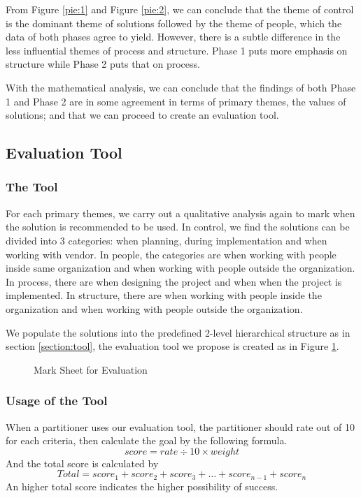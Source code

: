 From Figure \ref{pie:1} and Figure \ref{pie:2}, we can conclude that the theme of control is the dominant theme of solutions followed by the theme of people, which the data of both phases agree to yield. However, there is a subtle difference in the less influential themes of process and structure. Phase 1 puts more emphasis on structure while Phase 2 puts that on process.

With the mathematical analysis, we can conclude that the findings of both Phase 1 and Phase 2 are in some agreement in terms of primary themes, the values of solutions; and that we can proceed to create an evaluation tool.

\subsection{Evaluation Tool}

\subsubsection{The Tool}

For each primary themes, we carry out a qualitative analysis again to mark when the solution is recommended to be used. In control, we find the solutions can be divided into 3 categories: when planning, during implementation and when working with vendor. In people, the categories are when working with people inside same organization and when working with people outside the organization. In process, there are when designing the project and when when the project is implemented. In structure, there are when working with people inside the organization and when working with people outside the organization.

We populate the solutions into the predefined 2-level hierarchical structure as in section \ref{section:tool}, the evaluation tool we propose is created as in Figure \ref{table:tool}.

\begin{figure}[ht]
\centering
\caption{Mark Sheet for Evaluation}
\label{table:tool}
\end{figure}
\subsubsection{Usage of the Tool}

When a partitioner uses our evaluation tool, the partitioner should rate out of 10 for each criteria, then calculate the goal by the following formula.
$$
score = rate \div 10 \times weight
$$
And the total score is calculated by
$$
Total = score_1 + score_2 + score_3 + \ldots + score_{n-1} + score_n
$$
An higher total score indicates the higher possibility of success.
